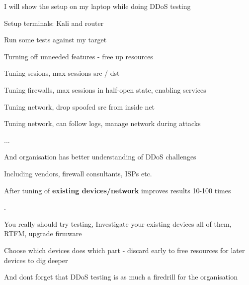 \documentclass[Screen16to9,17pt]{foils}
\begin{document}
\begin{list1}
\item I will show the setup on my laptop while doing DDoS testing
\item Setup terminals: Kali and router
\item Run some tests against my target
\end{list1}


\begin{list1}
\item Turning off unneeded features - free up resources
\item Tuning sesions, max sessions src / dst
\item Tuning firewalls, max sessions in half-open state, enabling services
\item Tuning network, drop spoofed src from inside net \smiley
\item Tuning network, can follow logs, manage network during attacks
\item ...
\item And organisation has better understanding of DDoS challenges
\item Including vendors, firewall consultants, ISPs etc.
\end{list1}

\vskip 1cm
\centerline{After tuning of {\bf existing devices/network} improves results 10-100 times}


.
\begin{list2}
\item You really should try testing, Investigate your existing devices all of them, RTFM, upgrade firmware
\item Choose which devices does which part - discard early to free resources for later devices to dig deeper
\item And dont forget that DDoS testing is as much a firedrill for the organisation
\end{list2}

\myquestionspage



\end{document}
